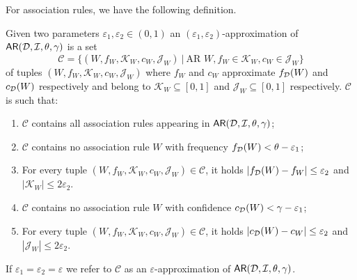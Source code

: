 For association rules, we have the following definition.
\begin{definition}\label{def:parmaeapproxar}
  Given two parameters $\varepsilon_1,\varepsilon_2\in(0,1)$ an
  $(\varepsilon_1,\varepsilon_2)$-approximation of $\mathsf{AR}({\cal D},{\cal I},\theta,\gamma)$
  is a set \[\mathcal{C}=\{(W, f_W, \mathcal{K}_W, c_W, \mathcal{J}_W)~|~ 
  \mbox{AR } W, f_W\in\mathcal{K}_W, c_W\in\mathcal{J}_W\}\]
  of tuples $(W, f_W, \mathcal{K}_W, c_W, \mathcal{J}_W)$ where $f_W$ and $c_W$
  approximate $f_{\cal D}(W)$ and $c_{\cal D}(W)$ respectively and belong to
  $\mathcal{K}_W\subseteq[0,1]$ and
  $\mathcal{J}_W\subseteq[0,1]$ respectively. $\mathcal{C}$ is such
  that:
  \begin{enumerate}
    \item $\mathcal{C}$ contains all association rules appearing in
      $\mathsf{AR}({\cal D},{\cal I},\theta,\gamma)$;
    \item $\mathcal{C}$ contains no association rule $W$ with frequency
      $f_{\cal D}(W)<\theta-\varepsilon_1$;
    \item For every tuple $(W, f_W,\mathcal{K}_W,
      c_W,\mathcal{J}_W)\in\mathcal{C}$, it holds
      $|f_{\cal D}(W)-f_W|\le\varepsilon_2$ and $|\mathcal{K}_W|\le 2\varepsilon_2$.
    \item $\mathcal{C}$ contains no association rule $W$ with confidence 
      $c_{\cal D}(W)<\gamma-\varepsilon_1$;
    \item For every tuple $(W, f_W,\mathcal{K}_W,
      c_W,\mathcal{J}_W)\in\mathcal{C}$, it holds
      $|c_{\cal D}(W)-c_W|\le\varepsilon_2$ and $|\mathcal{J}_W|\le 2\varepsilon_2$.
  \end{enumerate}
    If $\varepsilon_1=\varepsilon_2=\varepsilon$ we refer to $\mathcal{C}$ 
  as an $\varepsilon$-approximation of $\mathsf{AR}({\cal D},{\cal I},\theta,\gamma)$.
\end{definition}

